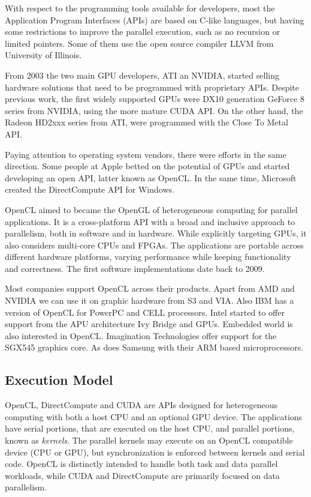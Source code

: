 \documentclass[prodmode,acmtecs]{acmsmall}
\begin{document}
With respect to the programming tools available for developers, most the Application Program Interfaces (APIs) are based on C-like languages, but having some restrictions to improve the parallel execution, such as no recursion or limited pointers. Some of them use the open source compiler LLVM \cite{LLVM} from University of Illinois.

From 2003 the two main GPU developers, ATI an NVIDIA, started selling hardware solutions that need to be programmed with proprietary APIs. Despite previous work, the first widely supported GPUs were DX10 generation GeForce 8 series from NVIDIA, using the more mature CUDA API. On the other hand, the Radeon HD2xxx series from ATI, were programmed with the Close To Metal API. 

Paying attention to operating system vendors, there were efforts in the same direction. Some people at Apple betted on the potential of GPUs and started developing an open API, latter known as OpenCL. In the same time, Microsoft created the DirectCompute API for Windows.

OpenCL aimed to became the OpenGL of heterogeneous computing for parallel applications. It is a cross-platform API with a broad and inclusive approach to parallelism, both in software and in hardware. While explicitly targeting GPUs, it also considers multi-core CPUs and FPGAs. The applications are portable across different hardware platforms, varying performance while keeping functionality and correctness. The first software implementations date back to 2009.

Most companies support OpenCL across their products. Apart from AMD and NVIDIA we can use it on graphic hardware from S3 and VIA. Also IBM has a version of OpenCL for PowerPC and CELL processors. Intel started to offer support from the APU architecture Ivy Bridge and GPUs. Embedded world is also interested in OpenCL. Imagination Technologies offer support for the SGX545 graphics core. As does Samsung with their ARM based microprocessors.

\subsection{Execution Model}

OpenCL, DirectCompute and CUDA are APIs designed for heterogeneous computing with both a host CPU and an optional GPU device. The applications have serial portions, that are executed on the host CPU, and parallel portions, known as \textit{kernels}. The parallel kernels may execute on an OpenCL compatible device (CPU or GPU), but synchronization is enforced between kernels and serial code. OpenCL is distinctly intended to handle both task and data parallel workloads, while CUDA and DirectCompute are primarily focused on data parallelism. 
\end{document}
